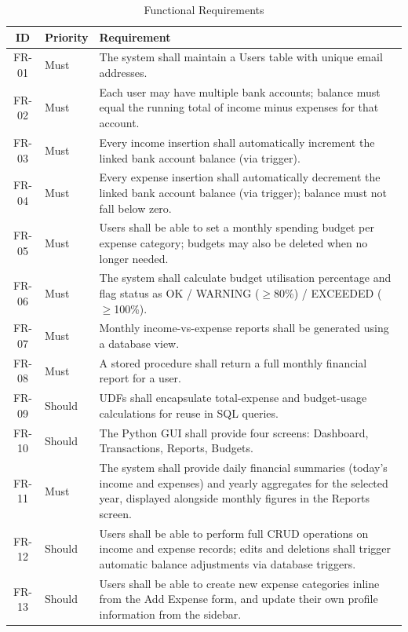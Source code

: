 \documentclass[12pt, a4paper]{article}
\begin{document}
\begin{table}[H]
\centering
\caption{Functional Requirements}
\begin{tabularx}{\textwidth}{clX}
\toprule
\textbf{ID} & \textbf{Priority} & \textbf{Requirement} \\
\midrule
FR-01 & Must & The system shall maintain a Users table with unique email addresses. \\
FR-02 & Must & Each user may have multiple bank accounts; balance must equal the running
               total of income minus expenses for that account. \\
FR-03 & Must & Every income insertion shall automatically increment the linked bank account
               balance (via trigger). \\
FR-04 & Must & Every expense insertion shall automatically decrement the linked bank account
               balance (via trigger); balance must not fall below zero. \\
FR-05 & Must & Users shall be able to set a monthly spending budget per expense category;
               budgets may also be deleted when no longer needed. \\
FR-06 & Must & The system shall calculate budget utilisation percentage and flag status as
               OK / WARNING (${\geq}$80\%) / EXCEEDED (${\geq}$100\%). \\
FR-07 & Must & Monthly income-vs-expense reports shall be generated using a database view. \\
FR-08 & Must & A stored procedure shall return a full monthly financial report for a user. \\
FR-09 & Should & UDFs shall encapsulate total-expense and budget-usage calculations for
                 reuse in SQL queries. \\
FR-10 & Should & The Python GUI shall provide four screens: Dashboard, Transactions,
                 Reports, Budgets. \\
FR-11 & Must & The system shall provide daily financial summaries (today's income and
               expenses) and yearly aggregates for the selected year, displayed
               alongside monthly figures in the Reports screen. \\
FR-12 & Should & Users shall be able to perform full CRUD operations on income and expense
                 records; edits and deletions shall trigger automatic balance adjustments
                 via database triggers. \\
FR-13 & Should & Users shall be able to create new expense categories inline from the
                 Add Expense form, and update their own profile information from the
                 sidebar. \\
\bottomrule
\end{tabularx}
\end{table}
\end{document}
